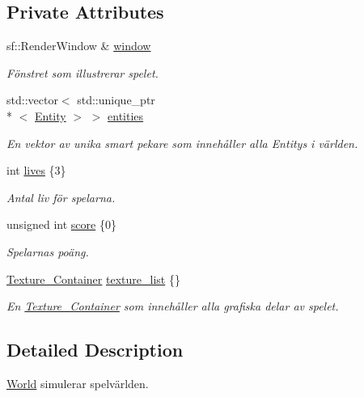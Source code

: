 \subsection*{Private Attributes}
\begin{DoxyCompactItemize}
\item 
sf\+::\+Render\+Window \& \hyperlink{classWorld_a81c4b706c899cd5cf8598ed79a691934}{window}
\begin{DoxyCompactList}\small\item\em Fönstret som illustrerar spelet. \end{DoxyCompactList}\item 
std\+::vector$<$ std\+::unique\+\_\+ptr\\*
$<$ \hyperlink{classEntity}{Entity} $>$ $>$ \hyperlink{classWorld_a74d706a3a47afe52b70f5e2dd3bf612b}{entities}
\begin{DoxyCompactList}\small\item\em En vektor av unika smart pekare som innehåller alla Entitys i världen. \end{DoxyCompactList}\item 
int \hyperlink{classWorld_af7d5c3e3405e2efaadf6cd76745440c6}{lives} \{3\}
\begin{DoxyCompactList}\small\item\em Antal liv för spelarna. \end{DoxyCompactList}\item 
unsigned int \hyperlink{classWorld_a8e0d399d947596356b65e8bcb5d4cad8}{score} \{0\}
\begin{DoxyCompactList}\small\item\em Spelarnas poäng. \end{DoxyCompactList}\item 
\hyperlink{classTexture__Container}{Texture\+\_\+\+Container} \hyperlink{classWorld_a77cc00620c137bb0b8b2620912b4dddc}{texture\+\_\+list} \{\}
\begin{DoxyCompactList}\small\item\em En \hyperlink{classTexture__Container}{Texture\+\_\+\+Container} som innehåller alla grafiska delar av spelet. \end{DoxyCompactList}\end{DoxyCompactItemize}


\subsection{Detailed Description}
\hyperlink{classWorld}{World} simulerar spelvärlden. 

